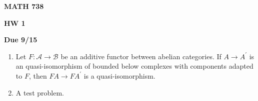 \documentclass[12pt]{amsart}
\begin{document}
\centerline{\bf MATH 738}
\centerline{\bf HW 1} 
\centerline{\bf Due 9/15}

\vspace{2em}

\begin{enumerate}
    
    \item Let $F: \mathcal A \to \mathcal B$ be an additive functor between abelian 
    categories. If $A \to A^\prime$ is an quasi-isomorphism of bounded below complexes 
    with components adapted to $F$, then $FA \to FA^\prime$ is a quasi-isomorphism. 

    \item A test problem.

\end{enumerate}
\end{document}
